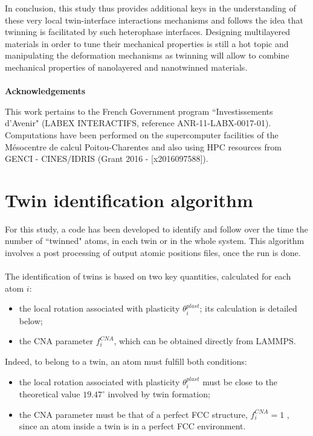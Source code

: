 \documentclass[final,3p,times,twocolumn]{elsarticle}
\begin{document}
In conclusion, this study thus provides additional keys in the understanding of these very local twin-interface interactions mechanisms and follows the idea that twinning is facilitated by such heterophase interfaces. Designing multilayered materials in order to tune their mechanical properties is still a hot topic and manipulating the deformation mechanisms as twinning will allow to combine mechanical properties of nanolayered and nanotwinned materials.
\\
\\

\noindent\textbf{Acknowledgements}\newline
\label{part_acknowledgements}

This work pertains to the French Government
program “Investissements d’Avenir" (LABEX INTERACTIFS, reference ANR-11-LABX-0017-01). Computations have been performed on the supercomputer facilities of the Mésocentre de calcul Poitou-Charentes and also using HPC resources from
GENCI - CINES/IDRIS (Grant 2016 - [x2016097588]).

\appendix
\section{Twin identification algorithm}
\label{part_appendix}

\renewcommand\thefigure{A.\arabic{figure}} 
\setcounter{figure}{0} 
\renewcommand\theequation{A.\arabic{equation}}
\setcounter{equation}{0}

For this study, a code has been developed to identify and follow over the time the number of ``twinned" atoms, in each twin or in the whole system. This algorithm involves a post processing of output atomic positions files, once the run is done. 
\\
\\
The identification of twins is based on two key quantities, calculated for each atom $i$:
\begin{itemize}
\item the local rotation associated with plasticity $\theta_{i}^{plast}$; its calculation is detailed below;
\item the CNA parameter $ f^{CNA}_{i} $, which can be obtained directly from LAMMPS.
\end{itemize}
Indeed, to belong to a twin, an atom must fulfill both conditions:
\begin{itemize}
\item the local rotation associated with plasticity $\theta_{i}^{plast}$ must be close to the theoretical value $19.47^{\circ}$ involved by twin formation;
\item the CNA parameter must be that of a perfect FCC structure, $f^{CNA}_{i} = 1$ , since an atom inside a twin is in a perfect FCC environment.
\end{itemize}
\end{document}
